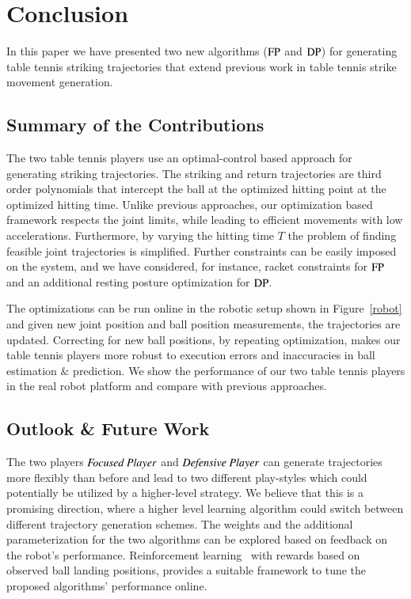 \section{Conclusion}\label{end}

In this paper we have presented two new algorithms ($\mathrm{FP}$ and $\mathrm{DP}$) for generating table tennis striking trajectories that extend previous work in table tennis strike movement generation. 

\subsection{Summary of the Contributions}

The two table tennis players use an optimal-control based approach for generating striking trajectories. The striking and return trajectories are third order polynomials that intercept the ball at the optimized hitting point at the optimized hitting time. Unlike previous approaches, our optimization based framework respects the joint limits, while leading to efficient movements with low accelerations. Furthermore, by varying the hitting time $T$ the problem of finding feasible joint trajectories is simplified. Further constraints can be easily imposed on the system, and we have considered, for instance, racket constraints for $\mathrm{FP}$ and an additional resting posture optimization for $\mathrm{DP}$. 

The optimizations can be run online in the robotic setup shown in Figure~\ref{robot} and given new joint position and ball position measurements, the trajectories are updated. Correcting for new ball positions, by repeating optimization, makes our table tennis players more robust to execution errors and inaccuracies in ball estimation $\&$ prediction. We show the performance of our two table tennis players in the real robot platform and compare with previous approaches.

\subsection{Outlook \& Future Work}

The two players $\emph{Focused Player}$ and $\emph{Defensive Player}$ can generate trajectories more flexibly than before and lead to two different play-styles which could potentially be utilized by a higher-level strategy. We believe that this is a promising direction, where a higher level learning algorithm could switch between different trajectory generation schemes. The weights and the additional parameterization for the two algorithms can be explored based on feedback on the robot's performance. Reinforcement learning~\citep{Sutton98} with rewards based on observed ball landing positions, provides a suitable framework to tune the proposed algorithms' performance online.

